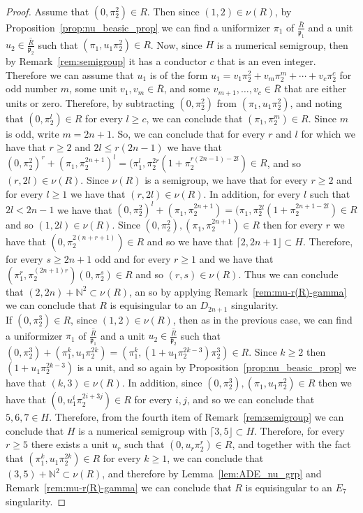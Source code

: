 \documentclass{article}
\numberwithin{theorem}{section}
\begin{document}
\begin{proof}
    Assume that $(0,\pi_2^2) \in R$. Then since $(1,2) \in \nu(R)$, by Proposition~\ref{prop:nu_beasic_prop} we can find a uniformizer $\pi_1$ of $\overline{\frac{R}{\mathfrak{p}_1}}$ and a unit $u_2 \in \overline{\frac{R}{\mathfrak{p}_2}}$ such that $(\pi_1, u_1\pi_2^{2}) \in R$. Now, since $H$ is a numerical semigroup, then by Remark~\ref{rem:semigroup} it has a conductor $c$ that is an even integer. Therefore we can assume that $u_1$ is of the form $u_1 = v_1 \pi_2^2 + v_m \pi_2^m + \cdots + v_c\pi_2^c$ for odd number $m$, some unit $v_1, v_m \in \overline{R}$, and some $v_{m+1}, \dots,v_c \in \overline{R}$ that are either units or zero. Therefore, by subtracting $(0,\pi_2^2)$ from $(\pi_1, u_1\pi_2^{2})$, and noting that $(0, \pi_2^l) \in R$ for every $l \geq c$, we can conclude that $(\pi_1, \pi_2^{m}) \in R$. Since $m$ is odd, write $m=2n+1$. So, we can conclude that for every $r$ and $l$ for which we have that $r \geq 2$ and $2l \leq r(2n-1)$ we have that $(0, \pi_2^2)^r + (\pi_1, \pi_2^{2n+1})^l = (\pi_1^l, \pi_2^{2r} ( 1+\pi_2^{r(2n-1)-2l}) \in R$, and so $(r, 2l) \in \nu(R)$. Since $\nu(R)$ is a semigroup, we have that for every $r \geq 2$ and for every $l \geq 1$ we have that $(r, 2l) \in \nu(R)$. In addition, for every $l$ such that $2l < 2n-1$ we have that $(0, \pi_2^2)^{l} + (\pi_1, \pi_2^{2n+1}) = (\pi_1, \pi_2^{2l}(1+\pi_2^{2n+1-2l}) \in R$ and so $(1,2l) \in \nu(R)$. Since $(0, \pi_2^2), (\pi_1, \pi_2^{2n+1}) \in R$ then for every $r$ we have that $(0, \pi_2^{2(n+r+1)}) \in R$ and so we have that $\lceil 2, 2n+1 \rfloor \subset H$. Therefore, for every  $s \geq 2n+1$ odd and for every $r \geq 1$ and we have that $(\pi_1^r, \pi_2^{(2n+1)r})(0, \pi_2^s)\in R$ and so $(r,s) \in \nu(R)$. Thus we can conclude that $(2, 2n) + \mathbb{N}^2 \subset \nu(R)$, an so by applying Remark~\ref{rem:mu-r(R)-gamma} we can conclude that $R$ is equisingular to an $D_{2n+1}$ singularity. \\

    If $(0,\pi_2^3) \in R$, since $(1,2) \in \nu(R)$, then as in the previous case, we can find a uniformizer $\pi_1$ of $\overline{\frac{R}{\mathfrak{p}_1}}$ and a unit $u_2 \in \overline{\frac{R}{\mathfrak{p}_2}}$ such that $(0,\pi_2^3)+ (\pi_1^k, u_1\pi_2^{2k}) = (\pi_1^k, (1+u_1\pi_2^{2k-3})\pi_2^3) \in R$. Since $k \geq 2$ then $(1+u_1\pi_2^{2k-3})$ is a unit, and so again by Proposition~\ref{prop:nu_beasic_prop} we have that $(k,3) \in \nu(R)$. In addition, since $(0,\pi_2^3), (\pi_1, u_1\pi_2^{2})  \in R$ then we have that $(0, u_1^i\pi_2^{2i+3j}) \in R$ for every $i,j$, and so we can conclude that $5,6,7 \in H$. Therefore, from the fourth item of Remark~\ref{rem:semigroup}  we can conclude that $H$ is a numerical semigroup with $\lceil 3, 5 \rfloor \subset H$. Therefore, for every $r \geq 5$ there exists a unit $u_r$ such that $(0,u_r \pi_2^r) \in R$, and together with the fact that $(\pi_1^k, u_1\pi_2^{2k}) \in R$ for every $k \geq 1$, we can conclude that $(3,5) + \mathbb{N}^2 \subset \nu(R)$, and therefore by Lemma~\ref{lem:ADE_nu_grp} and Remark~\ref{rem:mu-r(R)-gamma} we can conclude that $R$ is equisingular to an $E_7$ singularity. 
\end{proof} 
\end{document}
